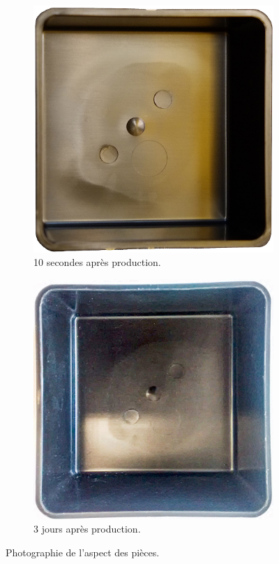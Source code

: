 \begin{figure}[hbtp]
	\centering
	\begin{subfigure}[c]{0.48\textwidth}
		\includegraphics[width=\textwidth]{../Chap2/Figures/163-35_r.jpeg}
		\caption{10 secondes après production.}
	\end{subfigure}
	\begin{subfigure}[c]{0.48\textwidth}
		\includegraphics[width=\textwidth]{../Chap2/Figures/IMG_20170620_141425887r.jpg}
		\caption{3 jours après production.}
	\end{subfigure}
	\caption{Photographie de l'aspect des pièces.}
	\label{fig:correlation_aspect}
\end{figure}


